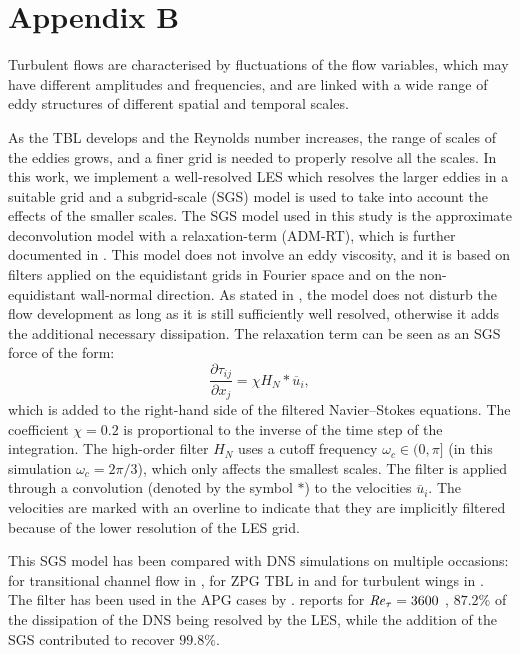 \section*{Appendix B} \label{sec:AppendixB}

Turbulent flows are characterised by fluctuations of the flow variables, which may have different amplitudes and frequencies, and are linked with a wide range of eddy structures of different spatial and temporal scales.

As the TBL develops and the Reynolds number increases, the range of scales of the eddies grows, and a finer grid is needed to properly resolve all the scales. In this work, we implement a well-resolved LES which resolves the larger eddies in a suitable grid and a subgrid-scale (SGS) model is used to take into account the effects of the smaller scales. The SGS model used in this study is the approximate deconvolution model with a relaxation-term (ADM-RT), which is further documented in \cite{Schlatter_2004}. 
This model does not involve an eddy viscosity, and it is based on filters applied on the equidistant grids in Fourier space and on the non-equidistant wall-normal direction. As stated in \cite{Schlatter_2004}, the model does not disturb the flow development as long as it is still sufficiently well resolved, otherwise it adds the additional necessary dissipation.
The relaxation term can be seen as an SGS force of the form:
\begin{equation*}
    \frac{\partial \tau_{ij}}{\partial x_j} = \chi H_N * \overline{u}_i,
\end{equation*}
which is added to the right-hand side of the filtered Navier--Stokes equations.
The coefficient $\chi=0.2$ is proportional to the inverse of the time step of the integration. The high-order filter $H_N$ uses a cutoff frequency $\omega_c \in (0, \pi]$ (in this simulation $\omega_c=2\pi/3$), which only affects the smallest scales. The filter is applied through a convolution (denoted by the symbol $*$) to the velocities $\overline{u}_i$. The velocities are marked with an overline to indicate that they are implicitly filtered because of the lower resolution of the LES grid.


This SGS model has been compared with DNS simulations on multiple occasions: for transitional channel flow in \cite{Schlatter_2004}, for ZPG TBL in \cite{E-AmorZPG} and for turbulent wings in \cite{NEGI_2018}. The filter has been used in the APG cases by \cite{Bobke_2016, bobke2017}.
\cite{E-AmorZPG} reports for $\mbox{\textit{Re}}_{\tau}=3600$ , $87.2\%$ of the dissipation of the DNS being resolved by the LES, while the addition of the SGS contributed to recover $99.8\%$.



 
